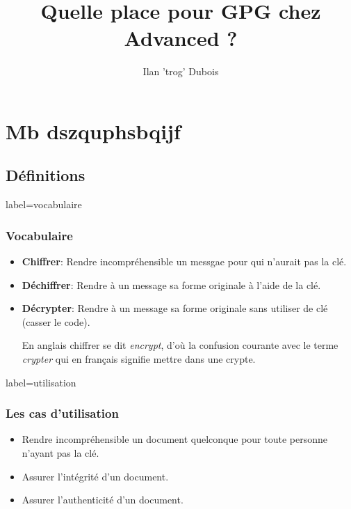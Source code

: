 \documentclass{beamer}
\title{Quelle place pour GPG chez Advanced ?}
\author{\cc Ilan 'trog' Dubois}
\begin{document}
    \begin{frame}
        \titlepage
    \end{frame}
    \section{Mb dszquphsbqijf}
    \subsection{Définitions}
        \begin{frame}{label=vocabulaire}
            \frametitle{Vocabulaire}
            \begin{center}
                \begin{itemize}
                    \item \textbf{Chiffrer}: Rendre incompréhensible un messgae pour qui n'aurait pas la clé.
                    \item \textbf{Déchiffrer}: Rendre à un message sa forme originale à l'aide de la clé.
                    \item \textbf{Décrypter}: Rendre à un message sa forme originale sans utiliser de clé (casser le code).
                    \begin{tcolorbox}[colback=green!5,colframe=green!40!black,title=Mais crypter alors ?]
                      En anglais chiffrer se dit \textit{encrypt}, d'où la confusion courante avec le terme \textit{crypter} qui en français signifie mettre dans une crypte.
                    \end{tcolorbox}
                \end{itemize}
            \end{center}
        \end{frame}
        \begin{frame}{label=utilisation}
            \frametitle{Les cas d'utilisation}
            \begin{center}
                \begin{itemize}
                    \item Rendre incompréhensible un document quelconque pour toute personne n'ayant pas la clé.
                    \item Assurer l'intégrité d'un document.
                    \item Assurer l'authenticité d'un document.
                \end{itemize}
            \end{center}
        \end{frame}
\end{document}
